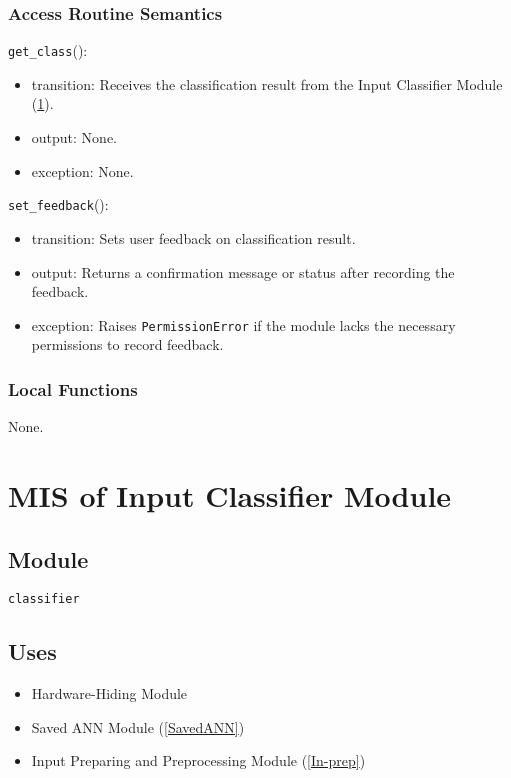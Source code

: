\documentclass[12pt, titlepage]{article}
\def\code#1{\texttt{#1}}
\begin{document}
\subsubsection{Access Routine Semantics}

\noindent \code{get\_class}():
\begin{itemize}
  \item transition: Receives the classification result from the Input Classifier Module (\ref{In-class}).
  \item output: None.
  \item exception: None.
\end{itemize}

\noindent \code{set\_feedback}():
\begin{itemize}
  \item transition: Sets user feedback on classification result. 
  \item output: Returns a confirmation message or status after recording the feedback.
  \item exception: Raises \code{PermissionError} if the module lacks the necessary permissions to record feedback.
\end{itemize}


\subsubsection{Local Functions}
None.

\section{MIS of Input Classifier Module} \label{In-class} 

\subsection{Module}
\code{classifier} 

\subsection{Uses}
\begin{itemize}
  \item Hardware-Hiding Module  
  \item Saved ANN Module (\ref{SavedANN})
  \item Input Preparing and Preprocessing Module (\ref{In-prep})
\end{itemize}
\end{document}
